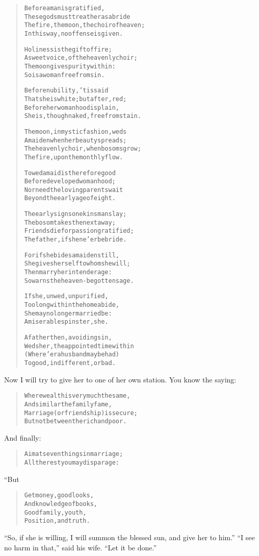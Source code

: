 \documentclass[article, twoside, 14pt]{memoir}
\renewenvironment{verbatim}{%
\begin{quote}%
\vskip -10pt%
\begin{alltt}\normalfont\large}{\end{alltt}%
\end{quote}%
\vskip -10pt
} %
\begin{document}
\begin{verbatim}
Before a man is gratified,
These gods must treat her as a bride{\textemdash}
The fire, the moon, the choir of heaven;
In this way, no offense is given.

Holiness is the gift of fire;
A sweet voice, of the heavenly choir;
The moon gives purity within:
So is a woman free from sin.

Before nubility, 'tis said
That she is white; but after, red;
Before her womanhood is plain,
She is, though naked, free from stain.

The moon, in mystic fashion, weds
A maiden when her beauty spreads;
The heavenly choir, when bosoms grow;
The fire, upon the monthly flow.

To wed a maid is therefore good
Before developed womanhood;
Nor need the loving parents wait
Beyond the early age of eight.

The early signs one kinsman slay;
The bosom takes the next away;
Friends die for passion gratified;
The father, if she ne'er be bride.

For if she bides a maiden still,
She gives herself to whom she will;
Then marry her in tender age:
So warns the heaven-begotten sage.

If she, unwed, unpurified,
Too long within the home abide,
She may no longer married be:
A miserable spinster, she.

A father then, avoiding sin,
Weds her, the appointed time within
(Where'er a husband may be had)
To good, indifferent, or bad.
\end{verbatim}
Now I will try to give her to one of her own station. You know the
saying:

\begin{verbatim}
Where wealth is very much the same,
And similar the family fame,
Marriage (or friendship) is secure;
But not between the rich and poor.
\end{verbatim}
And finally:

\begin{verbatim}
Aim at seven things in marriage;
All the rest you may disparage:
\end{verbatim}
“But

\begin{verbatim}
Get money, good looks,
And knowledge of books,
Good family, youth,
Position, and truth.
\end{verbatim}
``So, if she is willing, I will summon the blessed sun, and give her to him.''
``I see no harm in that,'' said his wife. ``Let it be done.''
\end{document}
